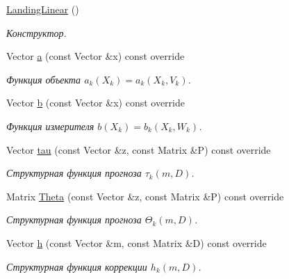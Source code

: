 \begin{DoxyCompactItemize}
\item 
\hypertarget{class_tasks_1_1_discrete_1_1_landing_linear_a635a395c8b9ef9bcece3201c26c258bf}{}\label{class_tasks_1_1_discrete_1_1_landing_linear_a635a395c8b9ef9bcece3201c26c258bf} 
\hyperlink{class_tasks_1_1_discrete_1_1_landing_linear_a635a395c8b9ef9bcece3201c26c258bf}{Landing\+Linear} ()
\begin{DoxyCompactList}\small\item\em Конструктор. \end{DoxyCompactList}\item 
Vector \hyperlink{class_tasks_1_1_discrete_1_1_landing_linear_af0c0c48603fc226055ee233f93fa21fc}{a} (const Vector \&x) const override
\begin{DoxyCompactList}\small\item\em Функция объекта $a_k(X_k) = a_k(X_k, V_k)$. \end{DoxyCompactList}\item 
Vector \hyperlink{class_tasks_1_1_discrete_1_1_landing_linear_a599d3491da6d84ba68c43433235e9980}{b} (const Vector \&x) const override
\begin{DoxyCompactList}\small\item\em Функция измерителя $b(X_k) = b_k(X_k, W_k)$. \end{DoxyCompactList}\item 
Vector \hyperlink{class_tasks_1_1_discrete_1_1_landing_linear_a8f2022967fae3dde3e7d2df3f7fa98f8}{tau} (const Vector \&z, const Matrix \&P) const override
\begin{DoxyCompactList}\small\item\em Структурная функция прогноза $\tau_k(m, D)$. \end{DoxyCompactList}\item 
Matrix \hyperlink{class_tasks_1_1_discrete_1_1_landing_linear_a88dda707914dea5698748f445563400f}{Theta} (const Vector \&z, const Matrix \&P) const override
\begin{DoxyCompactList}\small\item\em Структурная функция прогноза $\Theta_k(m, D)$. \end{DoxyCompactList}\item 
Vector \hyperlink{class_tasks_1_1_discrete_1_1_landing_linear_a9b1f90547fca3b460b48693b2e16219a}{h} (const Vector \&m, const Matrix \&D) const override
\begin{DoxyCompactList}\small\item\em Структурная функция коррекции $h_k(m, D)$. \end{DoxyCompactList}\item 

\end{DoxyCompactItemize}
